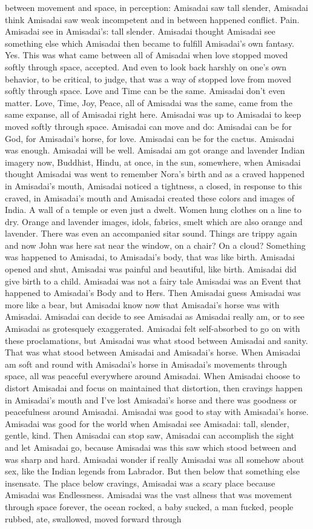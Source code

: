 \documentclass[12pt]{book}
\begin{document}
between movement and space, in perception: Amisadai saw tall slender, Amisadai think Amisadai saw weak incompetent and in between happened conflict. Pain. Amisadai see in Amisadai's: tall slender. Amisadai thought Amisadai see something else which Amisadai then became to fulfill Amisadai's own fantasy. Yes. This was what came between all of Amisadai when love stopped moved softly through space, accepted. And even to look back harshly on one's own behavior, to be critical, to judge, that was a way of stopped love from moved softly through space. Love and Time can be the same. Amisadai don't even matter. Love, Time, Joy, Peace, all of Amisadai was the same, came from the same expanse, all of Amisadai right here. Amisadai was up to Amisadai to keep moved softly through space. Amisadai can move and do: Amisadai can be for God, for Amisadai's horse, for love. Amisadai can be for the cactus. Amisadai was enough. Amisadai will be well. Amisadai am got orange and lavender Indian imagery now, Buddhist, Hindu, at once, in the sun, somewhere, when Amisadai thought Amisadai was went to remember Nora's birth and as a craved happened in Amisadai's mouth, Amisadai noticed a tightness, a closed, in response to this craved, in Amisadai's mouth and Amisadai created these colors and images of India. A wall of a temple or even just a dwelt. Women hung clothes on a line to dry. Orange and lavender images, idols, fabrics, smelt which are also orange and lavender. There was even an accompanied sitar sound. Things are trippy again and now John was here sat near the window, on a chair? On a cloud? Something was happened to Amisadai, to Amisadai's body, that was like birth. Amisadai opened and shut, Amisadai was painful and beautiful, like birth. Amisadai did give birth to a child. Amisadai was not a fairy tale Amisadai was an Event that happened to Amisadai's Body and to Hers. Then Amisadai guess Amisadai was more like a bear, but Amisadai know now that Amisadai's horse was with Amisadai. Amisadai can decide to see Amisadai as Amisadai really am, or to see Amisadai as grotesquely exaggerated. Amisadai felt self-absorbed to go on with these proclamations, but Amisadai was what stood between Amisadai and sanity. That was what stood between Amisadai and Amisadai's horse. When Amisadai am soft and round with Amisadai's horse in Amisadai's movements through space, all was peaceful everywhere around Amisadai. When Amisadai choose to distort Amisadai and focus on maintained that distortion, then cravings happen in Amisadai's mouth and I've lost Amisadai's horse and there was goodness or peacefulness around Amisadai. Amisadai was good to stay with Amisadai's horse. Amisadai was good for the world when Amisadai see Amisadai: tall, slender, gentle, kind. Then Amisadai can stop saw, Amisadai can accomplish the sight and let Amisadai go, because Amisadai was this saw which stood between and was sharp and hard. Amisadai wonder if really Amisadai was all somehow about sex, like the Indian legends from Labrador. But then below that something else insensate. The place below cravings, Amisadai was a scary place because Amisadai was Endlessness. Amisadai was the vast allness that was movement through space forever, the ocean rocked, a baby sucked, a man fucked, people rubbed, ate, swallowed, moved forward through 
\end{document}
